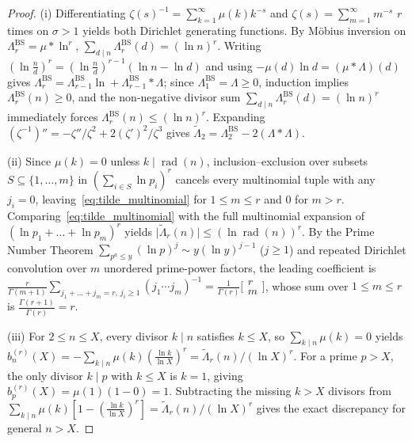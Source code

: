 \documentclass[11pt,reqno]{amsart}
\theoremstyle{definition}
\theoremstyle{remark}
\numberwithin{equation}{section}
\DeclareMathOperator{\rad}{rad}
\begin{document}
\begin{proof}
(i) Differentiating $\zeta(s)^{-1} = \sum_{k=1}^{\infty}\mu(k)k^{-s}$ and $\zeta(s) = \sum_{m=1}^{\infty} m^{-s}$ $r$ times on $\sigma > 1$ yields both Dirichlet generating functions. By M\"obius inversion on $\Lambda_r^{\mathrm{BS}} = \mu * \ln^r$, $\sum_{d \mid n} \Lambda_r^{\mathrm{BS}}(d) = (\ln n)^r$. Writing $(\ln\frac{n}{d})^r = (\ln\frac{n}{d})^{r-1}(\ln n - \ln d)$ and using $-\mu(d)\ln d = (\mu * \Lambda)(d)$ gives $\Lambda_r^{\mathrm{BS}} = \Lambda_{r-1}^{\mathrm{BS}}\ln + \Lambda_{r-1}^{\mathrm{BS}} * \Lambda$; since $\Lambda_1^{\mathrm{BS}} = \Lambda \ge 0$, induction implies $\Lambda_r^{\mathrm{BS}}(n) \ge 0$, and the non-negative divisor sum $\sum_{d \mid n}\Lambda_r^{\mathrm{BS}}(d) = (\ln n)^r$ immediately forces $\Lambda_r^{\mathrm{BS}}(n) \le (\ln n)^r$. Expanding $(\zeta^{-1})'' = -\zeta''/\zeta^2 + 2(\zeta')^2/\zeta^3$ gives $\widetilde{\Lambda}_2 = \Lambda_2^{\mathrm{BS}} - 2(\Lambda * \Lambda)$.

(ii) Since $\mu(k) = 0$ unless $k \mid \rad(n)$, inclusion--exclusion over subsets $S \subseteq \{1,\dots,m\}$ in $(\sum_{i \in S}\ln p_i)^r$ cancels every multinomial tuple with any $j_i = 0$, leaving~\eqref{eq:tilde_multinomial} for $1 \le m \le r$ and $0$ for $m > r$. Comparing~\eqref{eq:tilde_multinomial} with the full multinomial expansion of $(\ln p_1 + \dots + \ln p_m)^r$ yields $\lvert\widetilde{\Lambda}_r(n)\rvert \le (\ln\rad(n))^r$. By the Prime Number Theorem $\sum_{p^a \le y}(\ln p)^j \sim y(\ln y)^{j-1}$ ($j \ge 1$) and repeated Dirichlet convolution over $m$ unordered prime-power factors, the leading coefficient is $\frac{r}{\Gamma(m+1)}\sum_{j_1+\dots+j_m=r,\, j_i \ge 1} (j_1\cdots j_m)^{-1} = \frac{1}{\Gamma(r)}\bigl[\begin{smallmatrix} r \\ m \end{smallmatrix}\bigr]$, whose sum over $1 \le m \le r$ is $\frac{\Gamma(r+1)}{\Gamma(r)} = r$.

(iii) For $2 \le n \le X$, every divisor $k \mid n$ satisfies $k \le X$, so $\sum_{k \mid n}\mu(k) = 0$ yields $b_n^{(r)}(X) = -\sum_{k \mid n}\mu(k)(\frac{\ln k}{\ln X})^r = \widetilde{\Lambda}_r(n)/(\ln X)^r$. For a prime $p > X$, the only divisor $k \mid p$ with $k \le X$ is $k = 1$, giving $b_p^{(r)}(X) = \mu(1)(1 - 0) = 1$. Subtracting the missing $k > X$ divisors from $\sum_{k \mid n}\mu(k)[1 - (\frac{\ln k}{\ln X})^r] = \widetilde{\Lambda}_r(n)/(\ln X)^r$ gives the exact discrepancy for general $n > X$.
\end{proof}
\end{document}
